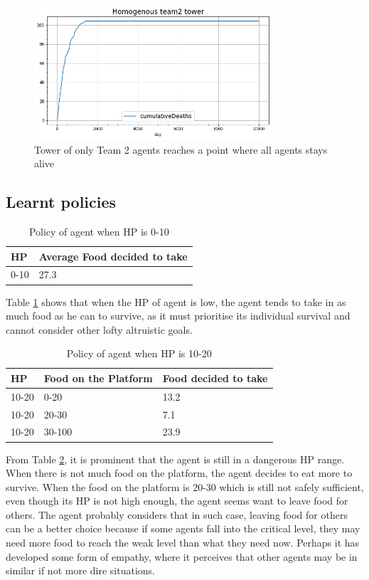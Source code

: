 \begin{figure}
\centering
\includegraphics{004_team_2_agent_design/252team2}
\caption{Tower of only Team 2 agents reaches a point where all agents stays alive}
\label{252team2}
\end{figure}

\subsection{Learnt policies}
\begin{table}
\centering
\caption{Policy of agent when HP is 0-10}
\label{lowhp-team2}
\begin{tabular}{@{}ll@{}}
\toprule
HP   & Average Food decided to take \\ \midrule
0-10 & 27.3                         \\ \bottomrule
\end{tabular}
\end{table}
Table \ref{lowhp-team2} shows that when the HP of agent is low, the agent tends to take in as much food as he can to survive, as it must prioritise its individual survival and cannot consider other lofty altruistic goals.

\begin{table}[]
\centering
\caption{Policy of agent when HP is 10-20}
\label{midhp-team2}
\begin{tabular}{@{}lll@{}}
\toprule
HP    & Food on the Platform & Food decided to take \\ \midrule
10-20 & 0-20                 & 13.2                 \\
10-20 & 20-30                & 7.1                  \\
10-20 & 30-100               & 23.9                 \\ \bottomrule
\end{tabular}
\end{table}

From Table \ref{midhp-team2}, it is prominent that the agent is still in a dangerous HP range. When there is not much food on the platform, the agent decides to eat more to survive.
When the food on the platform is 20-30 which is still not safely sufficient, even though its HP is not high enough, the agent seems want to leave food for others. The agent probably considers that in such case, leaving food for others can be a better choice because if some agents fall into the critical level, they may need more food to reach the weak level than what they need now. Perhaps it has developed some form of empathy, where it perceives that other agents may be in similar if not more dire situations. 

